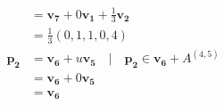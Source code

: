 \documentclass[12pt]{article}
\begin{document}
\begin{enumerate}
\begin{enumerate}
\begin{align*}
                                     & =\mathbf{v_7} + 0\mathbf{v_1} + \tfrac{1}{3} \mathbf{v_2}                                                    \\
                                     & = \tfrac{1}{3} (0,1,1,0,4)                                                                                   \\
                        \mathbf{p_2} & = \mathbf{v_6} + u\mathbf{v_5} \quad{} | \quad{} \mathbf{p_2} \in{} \mathbf{v_6} + A^{(4,5)}                 \\
                                     & = \mathbf{v_6} + 0\mathbf{v_5}                                                                               \\
                                     & = \mathbf{v_6}
                    \end{align*}

          \end{enumerate}
\end{enumerate}
\end{document}
